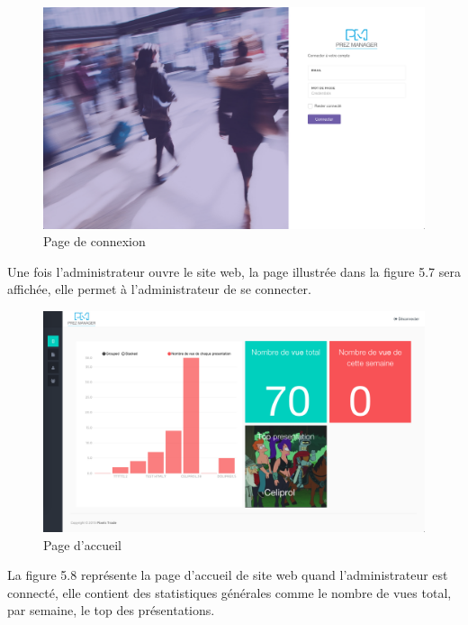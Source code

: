 \documentclass[12pt, ChapStyle1, oneside]{./Styles/Dea_Gsm}
\begin{document}
\begin{figure}[H]
    \centering
    \includegraphics[width=6in]{screenshots/web/login}
    \caption{Page de connexion}
\end{figure}
Une fois l'administrateur ouvre le site web, la page illustrée dans la figure 5.7 sera affichée, elle permet à l'administrateur de se connecter.
\begin{figure}[H]
    \centering
    \includegraphics[width=6in]{screenshots/web/home}
    \caption{Page d'accueil}
\end{figure}
La figure 5.8 représente la page d'accueil de site web quand l'administrateur est connecté, elle contient des statistiques générales comme le nombre de vues total, par semaine, le top des présentations.
\end{document}
